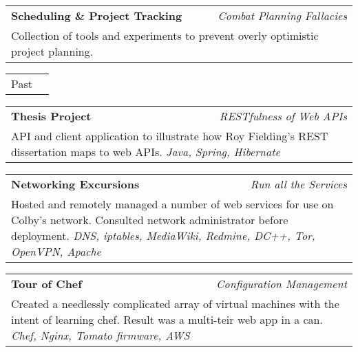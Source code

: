 \documentclass[10pt]{article} %
\begin{document}
{\begin{minipage}[t]{0.44\textwidth}
\vspace{5pt}

\begin{tabularx}{\linewidth}{ X r }
  {\textbf{Scheduling \& Project Tracking}} & {\small\textit{Combat Planning Fallacies}} \\
  \multicolumn{2}{p{\textwidth-2\fboxrule}}{ \small{ Collection of tools and experiments to prevent overly optimistic project planning. }}
\end{tabularx}

\vspace{10pt}

\begin{tabularx}{\linewidth}{ X r }
  {\large Past} \\
\end{tabularx}

\vspace{10pt}

\begin{tabularx}{\linewidth}{ X r }
  {\textbf{Thesis Project}} & {\small\textit{RESTfulness of Web APIs}} \\
  \multicolumn{2}{p{\textwidth-2\fboxrule}}{ \small{ API and client application to illustrate how Roy Fielding's REST dissertation maps to web APIs. \textit{Java, Spring, Hibernate} }}
\end{tabularx}

\vspace{5pt}

\begin{tabularx}{\linewidth}{ X r }
  {\textbf{Networking Excursions}} & {\small\textit{Run all the Services}} \\
  \multicolumn{2}{p{\textwidth-2\fboxrule}}{ \small{Hosted and remotely managed a number of web services for use on Colby's network. Consulted network administrator before deployment. \textit{DNS, iptables, MediaWiki, Redmine, DC++, Tor, OpenVPN, Apache}}}
\end{tabularx}

\vspace{5pt}

\begin{tabularx}{\linewidth}{ X r }
  {\textbf{Tour of Chef}} & {\small\textit{Configuration Management}} \\
  \multicolumn{2}{p{\textwidth-2\fboxrule}}{ \small{Created a needlessly complicated array of virtual machines with the intent of learning chef. Result was a multi-teir web app in a can. \textit{Chef, Nginx, Tomato firmware, AWS} }}
\end{tabularx}


\end{minipage}}
\end{document}
